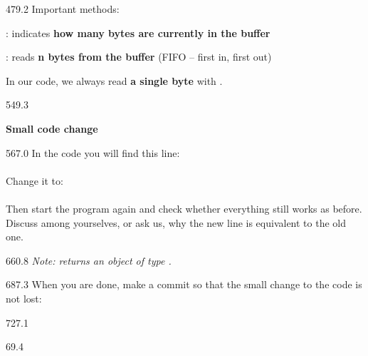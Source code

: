 \documentclass{aslab}
\begin{document}
\begin{region}[x=74.7,right=0,pitch=14.3]{479.2}
Important methods:
\begin{dotlist}
\item {}: indicates \textbf{how many bytes are currently in
  the buffer}
\item {}: reads \textbf{n bytes from the buffer} (FIFO -- first
  in, first out)
\end{dotlist}
In our code, we always read \textbf{a single byte} with .
\end{region}

\begin{region}{549.3}
\begin{tasks}[start=2]
\item \textbf{Small code change}
\end{tasks}
\end{region}

\begin{region}[x=74.7,right=0,pitch=13.35]{567.0}
In the code you will find this line:\\
\\
Change it to:\\
\\
Then start the program again and check whether everything still works as
before. Discuss among yourselves, or ask us, why the new line is equivalent
to the old one.
\end{region}

\begin{region}[x=74.7,right=0]{660.8}
\itshape Note:  returns an object of type
.
\end{region}

\begin{region}[pitch=13.2]{687.3}
When you are done, make a commit so that the small change to the code is not
lost:
\end{region}

\begin{region}[pitch=13.2]{727.1}
\\
\end{region}

\nextpage
\begin{region}{69.4}
\end{region}
\end{document}
